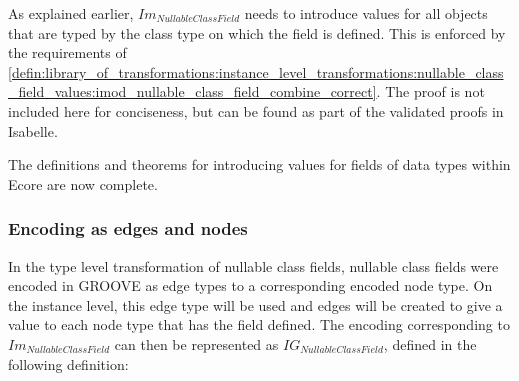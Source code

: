 As explained earlier, $Im_{NullableClassField}$ needs to introduce values for all objects that are typed by the class type on which the field is defined. This is enforced by the requirements of \cref{defin:library_of_transformations:instance_level_transformations:nullable_class_field_values:imod_nullable_class_field_combine_correct}. The proof is not included here for conciseness, but can be found as part of the validated proofs in Isabelle.

The definitions and theorems for introducing values for fields of data types within Ecore are now complete. 

\subsubsection{Encoding as edges and nodes}

In the type level transformation of nullable class fields, nullable class fields were encoded in GROOVE as edge types to a corresponding encoded node type. On the instance level, this edge type will be used and edges will be created to give a value to each node type that has the field defined. The encoding corresponding to $Im_{NullableClassField}$ can then be represented as $IG_{NullableClassField}$, defined in the following definition:

